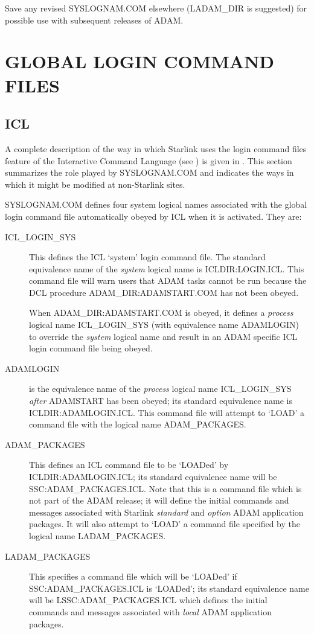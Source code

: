 Save any revised SYSLOGNAM.COM elsewhere (LADAM\_DIR is suggested) for
possible use with subsequent releases of ADAM.


\section{GLOBAL LOGIN COMMAND FILES}
\subsection{ICL}
\label{adampacks}
A complete description of the way in which Starlink uses the login command
files feature of the Interactive Command Language (see \cite{icl}) is given in
\cite{ssn64}.
This section summarizes the role played by SYS\-LOGNAM\-.COM and indicates
the ways in which it might be modified at non-Starlink sites.

SYSLOGNAM.COM defines four system logical names associated with the global
login command file automatically obeyed by ICL when it is activated.
They are:
\begin{description}
\item[ICL\_LOGIN\_SYS] This defines the ICL `system' login command file.
The standard equivalence name of the {\em system} logical name is
ICLDIR:\-LOGIN\-.ICL.
This command file will warn users that ADAM tasks cannot be run because
the DCL procedure ADAM\_DIR:\-ADAM\-START\-.COM has not been obeyed.

When ADAM\_DIR:\-ADAM\-START\-.COM is obeyed, it defines a {\em process}
logical name ICL\-\_LOGIN\-\_SYS (with equivalence name ADAMLOGIN) to override
the {\em system} logical name and result in an ADAM specific ICL login command
file being obeyed.
\item[ADAMLOGIN] is the equivalence name of the {\em process} logical name
ICL\_LOGIN\_SYS {\em after} ADAM\-START has been obeyed; its standard
equivalence name is ICL\-DIR:\-ADAM\-LOGIN\-.ICL.
This command file will attempt to `LOAD' a command file with the logical name
ADAM\-\_PACKAGES.
\item[ADAM\_PACKAGES] This defines an ICL command file to be `LOADed' by
ICL\-DIR:\-ADAM\-LOGIN\-.ICL; its standard equivalence name will be
SSC:\-ADAM\-\_PACK\-AGES\-.ICL.
Note that this is a command file which is not part of the ADAM
release; it will define the initial commands and messages associated with
Starlink {\em standard}\/ and {\em option}\/ ADAM application  packages.
It will also attempt to `LOAD' a command file specified by the logical name
LADAM\-\_PACKAGES.
\item[LADAM\_PACKAGES] This specifies a command file which will be `LOADed'
if SSC:\-ADAM\-\_PACK\-AGES\-.ICL is `LOADed'; its standard equivalence name
will be LSSC:\-ADAM\-\_PACK\-AGES\-.ICL which defines the initial commands and
messages associated with {\em local}\/ ADAM application packages.
\end{description}

